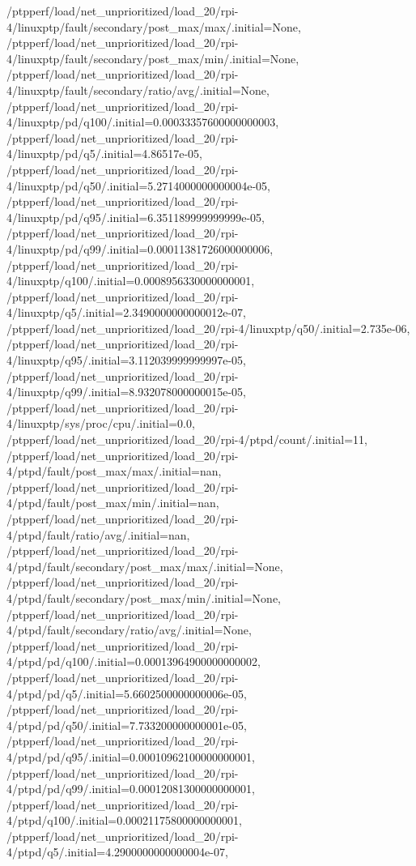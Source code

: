 {    /ptpperf/load/net_unprioritized/load_20/rpi-4/linuxptp/fault/secondary/post_max/max/.initial=None,
    /ptpperf/load/net_unprioritized/load_20/rpi-4/linuxptp/fault/secondary/post_max/min/.initial=None,
    /ptpperf/load/net_unprioritized/load_20/rpi-4/linuxptp/fault/secondary/ratio/avg/.initial=None,
    /ptpperf/load/net_unprioritized/load_20/rpi-4/linuxptp/pd/q100/.initial=0.00033357600000000003,
    /ptpperf/load/net_unprioritized/load_20/rpi-4/linuxptp/pd/q5/.initial=4.86517e-05,
    /ptpperf/load/net_unprioritized/load_20/rpi-4/linuxptp/pd/q50/.initial=5.2714000000000004e-05,
    /ptpperf/load/net_unprioritized/load_20/rpi-4/linuxptp/pd/q95/.initial=6.351189999999999e-05,
    /ptpperf/load/net_unprioritized/load_20/rpi-4/linuxptp/pd/q99/.initial=0.00011381726000000006,
    /ptpperf/load/net_unprioritized/load_20/rpi-4/linuxptp/q100/.initial=0.0008956330000000001,
    /ptpperf/load/net_unprioritized/load_20/rpi-4/linuxptp/q5/.initial=2.3490000000000012e-07,
    /ptpperf/load/net_unprioritized/load_20/rpi-4/linuxptp/q50/.initial=2.735e-06,
    /ptpperf/load/net_unprioritized/load_20/rpi-4/linuxptp/q95/.initial=3.112039999999997e-05,
    /ptpperf/load/net_unprioritized/load_20/rpi-4/linuxptp/q99/.initial=8.932078000000015e-05,
    /ptpperf/load/net_unprioritized/load_20/rpi-4/linuxptp/sys/proc/cpu/.initial=0.0,
    /ptpperf/load/net_unprioritized/load_20/rpi-4/ptpd/count/.initial=11,
    /ptpperf/load/net_unprioritized/load_20/rpi-4/ptpd/fault/post_max/max/.initial=nan,
    /ptpperf/load/net_unprioritized/load_20/rpi-4/ptpd/fault/post_max/min/.initial=nan,
    /ptpperf/load/net_unprioritized/load_20/rpi-4/ptpd/fault/ratio/avg/.initial=nan,
    /ptpperf/load/net_unprioritized/load_20/rpi-4/ptpd/fault/secondary/post_max/max/.initial=None,
    /ptpperf/load/net_unprioritized/load_20/rpi-4/ptpd/fault/secondary/post_max/min/.initial=None,
    /ptpperf/load/net_unprioritized/load_20/rpi-4/ptpd/fault/secondary/ratio/avg/.initial=None,
    /ptpperf/load/net_unprioritized/load_20/rpi-4/ptpd/pd/q100/.initial=0.00013964900000000002,
    /ptpperf/load/net_unprioritized/load_20/rpi-4/ptpd/pd/q5/.initial=5.6602500000000006e-05,
    /ptpperf/load/net_unprioritized/load_20/rpi-4/ptpd/pd/q50/.initial=7.733200000000001e-05,
    /ptpperf/load/net_unprioritized/load_20/rpi-4/ptpd/pd/q95/.initial=0.00010962100000000001,
    /ptpperf/load/net_unprioritized/load_20/rpi-4/ptpd/pd/q99/.initial=0.00012081300000000001,
    /ptpperf/load/net_unprioritized/load_20/rpi-4/ptpd/q100/.initial=0.00021175800000000001,
    /ptpperf/load/net_unprioritized/load_20/rpi-4/ptpd/q5/.initial=4.2900000000000004e-07,
}
